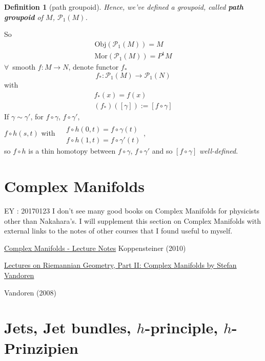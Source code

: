 \documentclass[10pt]{amsart}
\newtheorem{definition}{Definition}
\begin{document}
\begin{multicols*}{2}
\begin{definition}[path groupoid]
	Hence, we've defined a groupoid, called \textbf{path groupoid} of $M$, $\mathcal{P}_1(M)$. 
\end{definition}

So 
\[
\begin{gathered}
\text{Obj}(\mathcal{P}_1(M)) = M \\
\text{Mor}(\mathcal{P}_1(M)) = P^1M
\end{gathered}
\]
$\forall \, $ smooth $f:M \to N$, denote functor $f_*$
\begin{equation}
f_* : \mathcal{P}_1(M) \to \mathcal{P}_1(N)
\end{equation}
with 
\[
\begin{gathered}
f_*(x) = f(x) \\
(f_*)([\gamma]) := [f\circ \gamma]
\end{gathered}
\]
If $\gamma \sim \gamma'$, for $f\circ \gamma$, $f\circ \gamma'$, \\
$f\circ h(s,t) $ with $\begin{aligned} & \quad \\ 
& f\circ h(0,t) = f\circ \gamma(t) \\
& f\circ h(1,t) = f\circ \gamma'(t) \end{aligned}$, \\
so $f\circ h$ is a thin homotopy between $f\circ \gamma$, $f\circ \gamma'$ and so $[f\circ \gamma]$ \emph{well-defined}.




\part{Complex Manifolds}

EY : 20170123 I don't see many good books on Complex Manifolds for physicists other than Nakahara's.  I will supplement this section on Complex Manifolds with external links to the notes of other courses that I found useful to myself.


\href{http://www.caramdir.at/uploads/math/piii-cm/complex-manifolds.pdf}{Complex Manifolds - Lecture Notes}
Koppensteiner (2010) \cite{Kopp2010}


\href{http://www.staff.science.uu.nl/~vando101/MRIlectures.pdf}{Lectures on Riemannian Geometry, Part II: Complex Manifolds by Stefan Vandoren}

Vandoren (2008) \cite{Vand2008}

\part{Jets, Jet bundles, $h$-principle, $h$-Prinzipien}


\end{multicols*}
\end{document}
